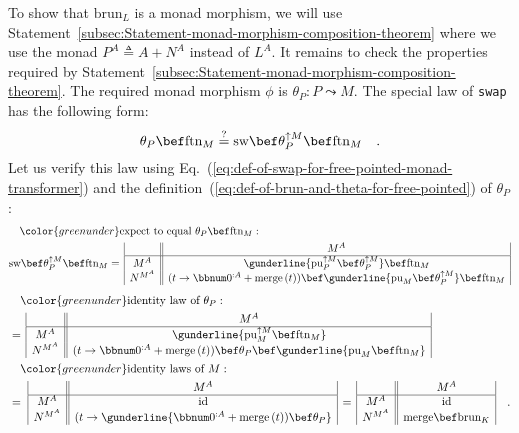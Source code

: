 To show that $\text{brun}_{L}$ is a monad morphism, we will use Statement~\ref{subsec:Statement-monad-morphism-composition-theorem}
where we use the monad $P^{A}\triangleq A+N^{A}$ instead of $L^{A}$.
It remains to check the properties required by Statement~\ref{subsec:Statement-monad-morphism-composition-theorem}.
The required monad morphism $\phi$ is $\theta_{P}:P\leadsto M$.
The special law of \lstinline!swap! has the following form: 
\[
\theta_{P}\bef\text{ftn}_{M}\overset{?}{=}\text{sw}\bef\theta_{P}^{\uparrow M}\bef\text{ftn}_{M}\quad.
\]
Let us verify this law using Eq.~(\ref{eq:def-of-swap-for-free-pointed-monad-transformer})
and the definition~(\ref{eq:def-of-brun-and-theta-for-free-pointed})
of $\theta_{P}$:
\begin{align*}
 & \quad{\color{greenunder}\text{expect to equal }\theta_{P}\bef\text{ftn}_{M}:}\quad\\
 & \text{sw}\bef\theta_{P}^{\uparrow M}\bef\text{ftn}_{M}=\,\begin{array}{|c||c|}
 & M^{A}\\
\hline M^{A} & \gunderline{\text{pu}_{P}^{\uparrow M}\bef\theta_{P}^{\uparrow M}}\bef\text{ftn}_{M}\\
N^{M^{A}} & (t\rightarrow\bbnum 0^{:A}+\text{merge}\,(t))\bef\gunderline{\text{pu}_{M}\bef\theta_{P}^{\uparrow M}}\bef\text{ftn}_{M}
\end{array}
\end{align*}
\begin{align*}
 & \quad{\color{greenunder}\text{identity law of }\theta_{P}:}\quad\\
 & =\,\begin{array}{|c||c|}
 & M^{A}\\
\hline M^{A} & \gunderline{\text{pu}_{M}^{\uparrow M}\bef\text{ftn}_{M}}\\
N^{M^{A}} & (t\rightarrow\bbnum 0^{:A}+\text{merge}\,(t))\bef\theta_{P}\bef\gunderline{\text{pu}_{M}\bef\text{ftn}_{M}}
\end{array}\\
 & \quad{\color{greenunder}\text{identity laws of }M:}\quad\\
 & =\,\,\begin{array}{|c||c|}
 & M^{A}\\
\hline M^{A} & \text{id}\\
N^{M^{A}} & (t\rightarrow\gunderline{\bbnum 0^{:A}+\text{merge}\,(t))\bef\theta_{P}}
\end{array}\,=\,\begin{array}{|c||c|}
 & M^{A}\\
\hline M^{A} & \text{id}\\
N^{M^{A}} & \text{merge}\bef\text{brun}_{K}
\end{array}\quad.
\end{align*}
